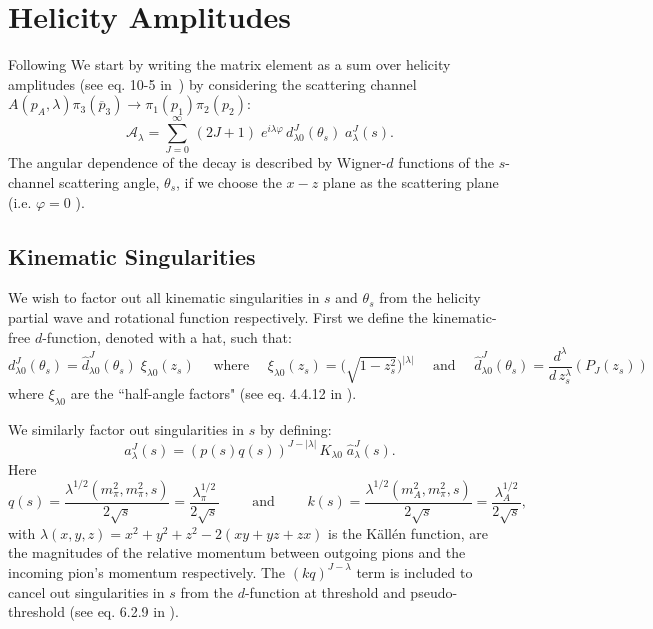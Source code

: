 \documentclass[10pt, aps,prd,amsmath,amssymb,superscriptaddress,onecolumn,
nofootinbib,showpacs,preprintnumbers]{revtex4-1}
\begin{document}
\section{Helicity Amplitudes}
Following \cite{Mikhasenko:2017rkh} We start by writing the matrix element as a sum over helicity amplitudes (see eq. 10-5 in~\cite{perl}) by considering the scattering channel \(A(p_A, \lambda) \pi_3(\overline{p}_3) \to  \pi_1(p_1)\pi_2(p_2)\):
  \begin{equation}
    \label{eq:helicity}
    \mathcal{A}_\lambda = \sum_{J= 0}^\infty \, (2J +1) \; e^{i\lambda\varphi} \, d_{\lambda0}^J(\theta_s) \; a_\lambda^J(s).
  \end{equation}
The angular dependence of the decay is described by Wigner-\(d\) functions of the \(s\)-channel scattering angle, \(\theta_s\), if we choose the \(x-z\) plane as the scattering plane (i.e. \(\varphi = 0 \) ).
\subsection{Kinematic Singularities}
We wish to factor out all kinematic singularities in \(s\) and \(\theta_s\) from the helicity partial wave and rotational function respectively. First we define the kinematic-free \(d\)-function, denoted with a hat, such that:
  \begin{equation}
      \label{eq:halfangle}
      d^J_{\lambda 0}(\theta_s) = \hat{d}^J_{\lambda 0}(\theta_s) \; \xi_{\lambda 0}(z_s) \quad \text{ where } \quad \xi_{\lambda 0}(z_s) = \bigg( \sqrt{ 1- z_s^2} \bigg)^{|\lambda|} \quad \text{ and } \quad \hat{d}^J_{\lambda 0}(\theta_s) = \frac{d^\lambda}{d \, z_s^\lambda} (P_J(z_s))
  \end{equation}
where \(\xi_{\lambda 0}\) are the ``half-angle factors" (see eq. 4.4.12 in \cite{Collins}).

We similarly factor out singularities in \(s\) by defining:
  \begin{equation}
    \label{eq:kinematicfreepartialwave}
    a^J_\lambda(s) = (p(s)q(s))^{J - |\lambda|} \, K_{\lambda 0} \; \hat{a}^J_\lambda(s).
  \end{equation}
Here
  \begin{equation}
    \label{eq:momenta}
    q(s) = \frac{\lambda^{1/2}(m_\pi^2, m_\pi^2, s)}{2\sqrt{s}} = \frac{\lambda_\pi^{1/2}}{2\sqrt{s}} \qquad \text{ and } \qquad k(s) = \frac{\lambda^{1/2}(m_A^2, m_\pi^2, s)}{2\sqrt{s}} = \frac{\lambda_A^{1/2}}{2\sqrt{s}} ,
  \end{equation}
with \(\lambda(x,y,z) = x^2 + y^2 + z^2 - 2 (xy + yz + zx)\) is the K\"{a}ll\'{e}n function, are the magnitudes of  the relative momentum between outgoing pions and the incoming pion's momentum respectively. The \((kq)^{J-\lambda}\) term is included to cancel out singularities in \(s\) from the \(d\)-function at threshold and pseudo-threshold (see eq. 6.2.9 in \cite{Collins}).
\end{document}
